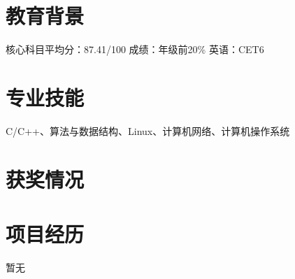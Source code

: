 \documentclass{uniquecv}
\begin{document}

\medskip




\section{教育背景}
核心科目平均分：87.41/100 \quad 成绩：年级前20\% \quad 英语：CET6



\section{专业技能}
\smallskip
C/C++、算法与数据结构、Linux、计算机网络、计算机操作系统



\section{获奖情况}
\medskip


\section{项目经历}
暂无

\end{document}

